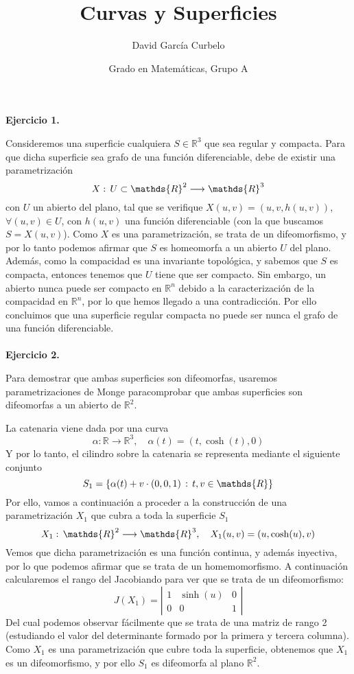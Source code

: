 \documentclass[fleqn]{article}
\title{Curvas y Superficies}
\author{David García Curbelo}
\date{Grado en Matemáticas, Grupo A}
\def\R{\mathds{R}}
\begin{document}
        \maketitle
        \setcounter{page}{1}
        \pagestyle{plain}

        \textbf{Ejercicio 1. } 
        
        Consideremos una superficie cualquiera $S\in \R^3$ que sea regular y compacta. Para que dicha superficie sea grafo de 
        una función diferenciable, debe de existir una parametrización 
        $$X: \thinspace U\subset \R^2 \longrightarrow \R^3$$
        con $U$ un abierto del plano, tal que se verifique $X(u,v) = (u, v, h(u,v))$, $\forall (u,v) \in U$, con $h(u,v)$ una función
        diferenciable (con la que buscamos $S = X(u,v)$). Como $X$ es una parametrización, se trata de un difeomorfismo, y por lo tanto podemos afirmar
        que $S$ es homeomorfa a un abierto $U$ del plano. Además, como la compacidad es una invariante topológica, y sabemos que $S$ es compacta, entonces tenemos que
        $U$ tiene que ser compacto. Sin embargo, un abierto nunca puede ser compacto en $\R^n$ debido a la caracterización de la compacidad en $\R^n$, 
        por lo que hemos llegado a una contradicción. Por ello concluimos que una superficie regular compacta no puede ser nunca el grafo de una 
        función diferenciable.\\ \\



        \textbf{Ejercicio 2. } 
        
        Para demostrar que ambas superficies son difeomorfas, usaremos parametrizaciones de Monge paracomprobar que ambas 
        superficies son difeomorfas a un abierto de $\R^2$.

        La catenaria viene dada por una curva 
        $$\alpha : \R \longrightarrow \R^3, \quad \alpha(t)=(t, \cosh (t), 0)$$
        Y por lo tanto, el cilindro sobre la catenaria se representa mediante el siguiente conjunto
        $$S_1 = \{\alpha(t) + v\cdot (0,0,1) \thinspace : \thinspace t,v \in \R\}$$
        Por ello, vamos a continuación a proceder a la construcción de una parametrización $X_1$ que cubra a toda la superficie $S_1$
        $$X_1: \thinspace \R^2 \longrightarrow \R^3, \quad X_1(u,v) = (u, \cosh (u), v)$$
        Vemos que dicha parametrización es una función continua, y además inyectiva, por lo que podemos afirmar que se trata de un homemomorfismo.
        A continuación calcularemos el rango del Jacobiando para ver que se trata de un difeomorfismo:
        $$J(X_1)= \left|
                \begin{matrix}
                        1 & \sinh(u) & 0 \\
                        0 & 0 & 1
                \end{matrix}
        \right|$$
        Del cual podemos observar fácilmente que se trata de una matriz de rango 2 (estudiando el valor del determinante formado por la primera y 
        tercera columna). Como $X_1$ es una parametrización que cubre toda la superficie, obtenemos 
        que $X_1$ es un difeomorfismo, y por ello $S_1$ es difeomorfa al plano $\R^2$.
\end{document}
